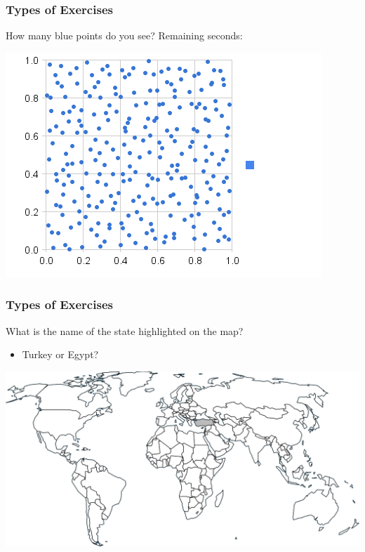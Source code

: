 \documentclass[xcolor=svgnames]{beamer}
\begin{document}
\begin{frame}
	\frametitle{Types of Exercises}
	How many blue points do you see? Remaining seconds: {\Huge{}\only<10>{1}}

	\begin{center}
		\medskip
		\includegraphics[width=.7\textwidth]{2013-VV041-student-modeling/random-plot.png}
	\end{center}
\end{frame}
\begin{frame}
\end{frame}
\begin{frame}
	\frametitle{Types of Exercises}
	What is the name of the state highlighted on the map?
	\begin{itemize}
		\item 	Turkey or Egypt?
	\end{itemize}
	\begin{center}
		\medskip
		\includegraphics[width=.95\textwidth]{2013-VV041-student-modeling/map.png}
	\end{center}
\end{frame}
\end{document}
